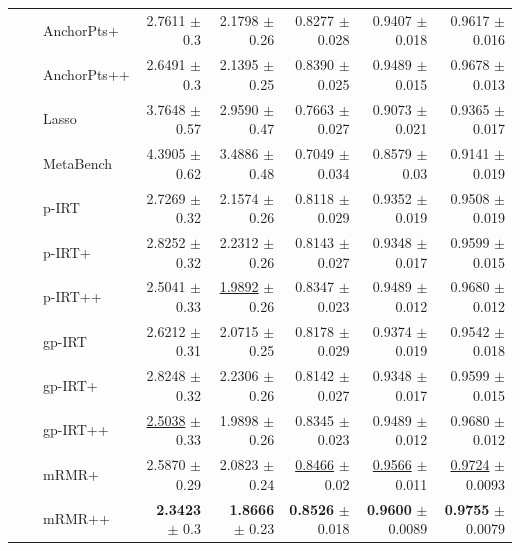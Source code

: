 \begin{longtable}{llp{}rrrrr}
 &  & AnchorPts+ & 2.7611 {\scriptsize $\pm$ 0.3} & 2.1798 {\scriptsize $\pm$ 0.26} & 0.8277 {\scriptsize $\pm$ 0.028} & 0.9407 {\scriptsize $\pm$ 0.018} & 0.9617 {\scriptsize $\pm$ 0.016} \\
 &  & AnchorPts++ & 2.6491 {\scriptsize $\pm$ 0.3} & 2.1395 {\scriptsize $\pm$ 0.25} & 0.8390 {\scriptsize $\pm$ 0.025} & 0.9489 {\scriptsize $\pm$ 0.015} & 0.9678 {\scriptsize $\pm$ 0.013} \\
 &  & Lasso & 3.7648 {\scriptsize $\pm$ 0.57} & 2.9590 {\scriptsize $\pm$ 0.47} & 0.7663 {\scriptsize $\pm$ 0.027} & 0.9073 {\scriptsize $\pm$ 0.021} & 0.9365 {\scriptsize $\pm$ 0.017} \\
 &  & MetaBench & 4.3905 {\scriptsize $\pm$ 0.62} & 3.4886 {\scriptsize $\pm$ 0.48} & 0.7049 {\scriptsize $\pm$ 0.034} & 0.8579 {\scriptsize $\pm$ 0.03} & 0.9141 {\scriptsize $\pm$ 0.019} \\
 &  & p-IRT & 2.7269 {\scriptsize $\pm$ 0.32} & 2.1574 {\scriptsize $\pm$ 0.26} & 0.8118 {\scriptsize $\pm$ 0.029} & 0.9352 {\scriptsize $\pm$ 0.019} & 0.9508 {\scriptsize $\pm$ 0.019} \\
 &  & p-IRT+ & 2.8252 {\scriptsize $\pm$ 0.32} & 2.2312 {\scriptsize $\pm$ 0.26} & 0.8143 {\scriptsize $\pm$ 0.027} & 0.9348 {\scriptsize $\pm$ 0.017} & 0.9599 {\scriptsize $\pm$ 0.015} \\
 &  & p-IRT++ & 2.5041 {\scriptsize $\pm$ 0.33} & \underline{1.9892} {\scriptsize $\pm$ 0.26} & 0.8347 {\scriptsize $\pm$ 0.023} & 0.9489 {\scriptsize $\pm$ 0.012} & 0.9680 {\scriptsize $\pm$ 0.012} \\
 &  & gp-IRT & 2.6212 {\scriptsize $\pm$ 0.31} & 2.0715 {\scriptsize $\pm$ 0.25} & 0.8178 {\scriptsize $\pm$ 0.029} & 0.9374 {\scriptsize $\pm$ 0.019} & 0.9542 {\scriptsize $\pm$ 0.018} \\
 &  & gp-IRT+ & 2.8248 {\scriptsize $\pm$ 0.32} & 2.2306 {\scriptsize $\pm$ 0.26} & 0.8142 {\scriptsize $\pm$ 0.027} & 0.9348 {\scriptsize $\pm$ 0.017} & 0.9599 {\scriptsize $\pm$ 0.015} \\
 &  & gp-IRT++ & \underline{2.5038} {\scriptsize $\pm$ 0.33} & 1.9898 {\scriptsize $\pm$ 0.26} & 0.8345 {\scriptsize $\pm$ 0.023} & 0.9489 {\scriptsize $\pm$ 0.012} & 0.9680 {\scriptsize $\pm$ 0.012} \\
 &  & mRMR+ & 2.5870 {\scriptsize $\pm$ 0.29} & 2.0823 {\scriptsize $\pm$ 0.24} & \underline{0.8466} {\scriptsize $\pm$ 0.02} & \underline{0.9566} {\scriptsize $\pm$ 0.011} & \underline{0.9724} {\scriptsize $\pm$ 0.0093} \\
 &  & mRMR++ & \textbf{2.3423} {\scriptsize $\pm$ 0.3} & \textbf{1.8666} {\scriptsize $\pm$ 0.23} & \textbf{0.8526} {\scriptsize $\pm$ 0.018} & \textbf{0.9600} {\scriptsize $\pm$ 0.0089} & \textbf{0.9755} {\scriptsize $\pm$ 0.0079} \\

\end{longtable}
